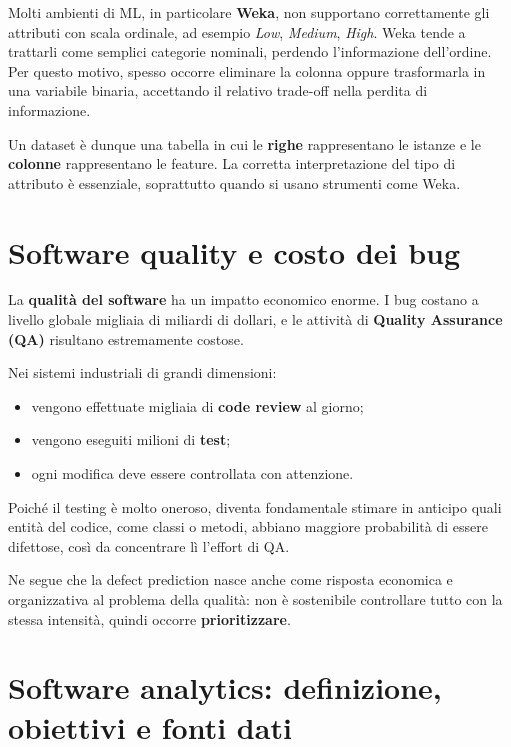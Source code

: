 \begin{notaesame}
Molti ambienti di ML, in particolare \textbf{Weka}, non supportano correttamente gli attributi con scala ordinale, ad esempio \emph{Low}, \emph{Medium}, \emph{High}. Weka tende a trattarli come semplici categorie nominali, perdendo l'informazione dell'ordine. Per questo motivo, spesso occorre eliminare la colonna oppure trasformarla in una variabile binaria, accettando il relativo trade-off nella perdita di informazione.
\end{notaesame}

Un dataset è dunque una tabella in cui le \textbf{righe} rappresentano le istanze e le \textbf{colonne} rappresentano le feature. La corretta interpretazione del tipo di attributo è essenziale, soprattutto quando si usano strumenti come Weka.

\section{Software quality e costo dei bug}

La \textbf{qualità del software} ha un impatto economico enorme. I bug costano a livello globale migliaia di miliardi di dollari, e le attività di \textbf{Quality Assurance (QA)} risultano estremamente costose.

Nei sistemi industriali di grandi dimensioni:
\begin{itemize}
    \item vengono effettuate migliaia di \textbf{code review} al giorno;
    \item vengono eseguiti milioni di \textbf{test};
    \item ogni modifica deve essere controllata con attenzione.
\end{itemize}

\begin{notaprof}
Poiché il testing è molto oneroso, diventa fondamentale stimare in anticipo quali entità del codice, come classi o metodi, abbiano maggiore probabilità di essere difettose, così da concentrare lì l'effort di QA.
\end{notaprof}

Ne segue che la defect prediction nasce anche come risposta economica e organizzativa al problema della qualità: non è sostenibile controllare tutto con la stessa intensità, quindi occorre \textbf{prioritizzare}.

\section{Software analytics: definizione, obiettivi e fonti dati}

